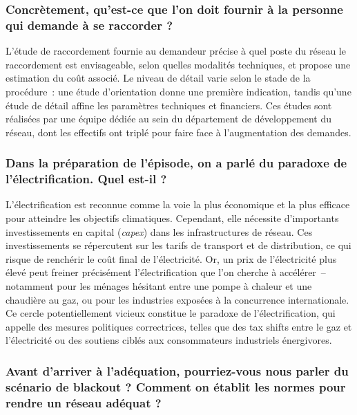 \subsubsection{Concrètement, qu'est-ce que l'on doit fournir à la personne qui demande à se raccorder ?}

L'étude de raccordement fournie au demandeur précise à quel poste du réseau le raccordement est envisageable, selon quelles modalités techniques, et propose une estimation du coût associé. Le niveau de détail varie selon le stade de la procédure~: une étude d'orientation donne une première indication, tandis qu'une étude de détail affine les paramètres techniques et financiers. Ces études sont réalisées par une équipe dédiée au sein du département de développement du réseau, dont les effectifs ont triplé pour faire face à l'augmentation des demandes.

\subsubsection{Dans la préparation de l'épisode, on a parlé du paradoxe de l'électrification. Quel est-il ?}

L'électrification est reconnue comme la voie la plus économique et la plus efficace pour atteindre les objectifs climatiques. Cependant, elle nécessite d'importants investissements en capital (\textit{capex}) dans les infrastructures de réseau. Ces investissements se répercutent sur les tarifs de transport et de distribution, ce qui risque de renchérir le coût final de l'électricité. Or, un prix de l'électricité plus élevé peut freiner précisément l'électrification que l'on cherche à accélérer~-- notamment pour les ménages hésitant entre une pompe à chaleur et une chaudière au gaz, ou pour les industries exposées à la concurrence internationale. Ce cercle potentiellement vicieux constitue le paradoxe de l'électrification, qui appelle des mesures politiques correctrices, telles que des tax shifts entre le gaz et l'électricité ou des soutiens ciblés aux consommateurs industriels énergivores.

\subsubsection{Avant d'arriver à l'adéquation, pourriez-vous nous parler du scénario de blackout ? Comment on établit les normes pour rendre un réseau adéquat ?}

